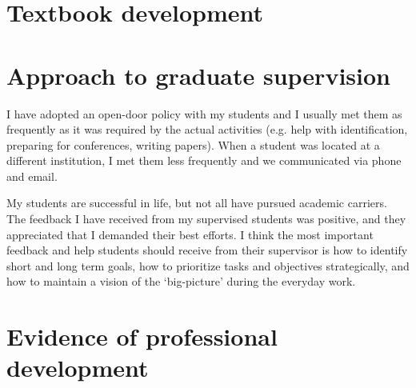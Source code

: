 \section{Textbook development} %




\section{Approach to graduate supervision} %

I have adopted an open-door policy with my students and I usually met them as frequently as it was required by the actual activities (e.g. help with identification, preparing for conferences, writing papers). When a student was located at a different institution, I met them less frequently and we communicated via phone and email.
\vspace{0.5pc}

My students are successful in life, but not all have pursued academic carriers. The feedback I have received from my supervised students was positive, and they appreciated that I demanded their best efforts. I think the most important feedback and help students should receive from their supervisor is how to identify short and long term goals, how to prioritize tasks and objectives strategically, and how to maintain a vision of the `big-picture' during the everyday work.

\section{Evidence of professional development} %


